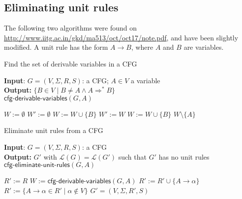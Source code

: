 \documentclass[11pt]{article}
\newcommand*{\Language}[1]{\ensuremath{\mathcal{L}(#1)}}
\begin{document}
\newpage

\subsection{Eliminating unit rules}
The following two algorithms were found on \url{http://www.iitg.ac.in/gkd/ma513/oct/oct17/note.pdf}, and have been slightly modified.
A unit rule has the form $A \rightarrow B$, where $A$ and $B$ are variables.

\begin{algorithm}
\small
\caption{Find the set of derivable variables in a CFG}
\vspace*{1ex}
{\textbf{Input}:}
$G = (V, \Sigma, R, S)$: a CFG; $A \in V$ a variable \\
\textbf{Output:}
$\{ B \in V \mid B \neq A \land A \Rightarrow^* B \}$ \\

$\textsf{cfg-derivable-variables}(G, A)$
\begin{algorithmic}[1]
\State $W := \emptyset$
\State $W' := \emptyset$
  \State $W := W \cup \{ B \}$
\EndFor
{}
  \State $W' := W$
    \State $W := W \cup \{ B \}$
  \EndFor  
\EndWhile
\State \Return $W \setminus \{ A \}$
\end{algorithmic}
\end{algorithm}

\begin{algorithm}
\small
\caption{Eliminate unit rules from a CFG}
\vspace*{1ex}
{\textbf{Input}:}
$G = (V, \Sigma, R, S)$: a CFG \\
\textbf{Output:}
$G'$ with $\Language{G} = \Language{G'}$ such that $G'$ has no unit rules \\

$\textsf{cfg-eliminate-unit-rules}(G, A)$
\begin{algorithmic}[1]
\State $R' := R$
  \State $W := \textsf{cfg-derivable-variables}(G, A) $
    \State $R' := R' \cup \{ A \rightarrow \alpha \}$ 
  \EndFor
\EndFor
\State $R' := \{ A \rightarrow \alpha \in R' \mid \alpha \notin V \}$
\State \Return $G' = (V, \Sigma, R', S)$
\end{algorithmic}
\end{algorithm}
\end{document}
